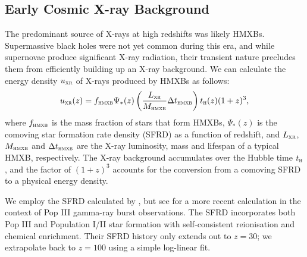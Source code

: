 \documentclass{thesis}
\newcommand{\tH}{\ensuremath{{t}_{\textsc{h}}}\xspace}
\newcommand{\uxr}{\ensuremath{{u}_{\textsc{xr}}}\xspace}
\newcommand{\Lxr}{\ensuremath{L_{\textsc{xr}}}\xspace}
\newcommand{\sfrz}{\ensuremath{\Psi_{*}(z)}\xspace}
\newcommand{\xrb}{\ensuremath{\textsc{hmxb}}\xspace}
\begin{document}
\subsection{Early Cosmic X-ray Background}
\label{HMXB}
The predominant source of X-rays at high redshifts was likely HMXBs.
Supermassive black holes were not yet common during this era, and
while supernovae produce significant X-ray radiation, their transient
nature precludes them from efficiently building up an X-ray
background. We can calculate the energy density \uxr
of X-rays produced by HMXBs as follows:
\begin{equation}
  \uxr(z) = f_{\xrb} \sfrz \left(\frac{\Lxr}{M_{\xrb}}\Delta t_{\xrb}\right) 
  \tH(z) (1+z)^3,
\end{equation}
where $f_{\xrb}$ is the mass fraction of stars that form HMXBs, \sfrz
is the comoving star formation rate density (SFRD) as a function of
redshift, and $\Lxr$, $M_{\xrb}$ and $\Delta t_{\xrb}$ are the
X-ray luminosity, mass and lifespan of a typical HMXB, respectively.  The
X-ray background accumulates over the Hubble time \tH, and the factor
of $(1+z)^3$ accounts for the conversion from a comoving SFRD to a
physical energy density. 

We employ the SFRD calculated by \citet{GreifBromm2006}, but see \citet{Campisietal2011} for a more recent calculation in the context of Pop III gamma-ray burst observations. The \citet{GreifBromm2006} SFRD incorporates both Pop III and Population I/II star formation with self-consistent reionisation and chemical enrichment.  Their SFRD history only extends out to $z=30$; we
extrapolate back to $z=100$ using a simple log-linear fit. 
\end{document}
